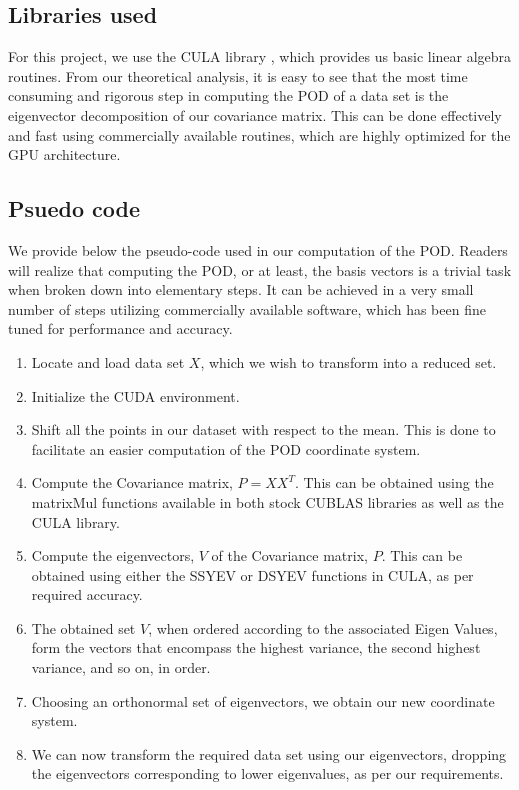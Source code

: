 \documentclass[submit]{aiaa-tc_mod}%
\begin{document}
\subsection{Libraries used}
For this project, we use the CULA library \cite{culamain}, which provides us basic linear algebra routines. From our theoretical analysis, it is easy to see that the most time consuming and rigorous step in computing the POD of a data set is the eigenvector decomposition of our covariance matrix. This can be done effectively and fast using commercially available routines, which are highly optimized for the GPU architecture. 
\subsection{Psuedo code}
We provide below the pseudo-code used in our computation of the POD. Readers will realize that computing the POD, or at least, the basis vectors is a trivial task when broken down into elementary steps. It can be achieved in a very small number of steps utilizing commercially available software, which has been fine tuned for performance and accuracy. 

\begin{enumerate}
\item
Locate and load data set $X$, which we wish to transform into a reduced set.

\item
Initialize the CUDA environment. 

\item
Shift all the points in our dataset with respect to the mean. This is done to facilitate an easier computation of the POD coordinate system. 

\item
Compute the Covariance matrix, $P = X X^T$. This can be obtained using the matrixMul functions available in both stock CUBLAS libraries as well as the CULA library.

\item
Compute the eigenvectors, $V$ of the Covariance matrix, $P$. This can be obtained using either the SSYEV or DSYEV functions in CULA, as per required accuracy. 

\item 
The obtained set $V$, when ordered according to the associated Eigen Values, form the vectors that encompass the highest variance, the second highest variance, and so on, in order. 

\item
Choosing an orthonormal set of eigenvectors, we obtain our new coordinate system. 

\item
We can now transform the required data set using our eigenvectors, dropping the eigenvectors corresponding to lower eigenvalues, as per our requirements.
\end{enumerate}
\clearpage
\end{document}

